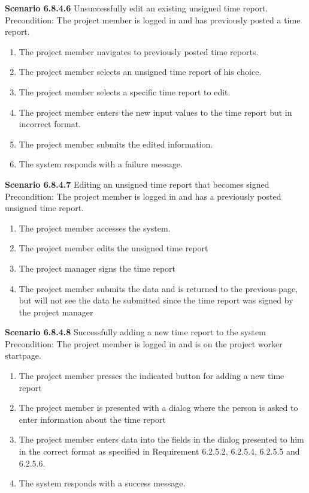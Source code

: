 \documentclass{article}
\begin{document}
\noindent\textbf{Scenario 6.8.4.6} Unsuccessfully edit an existing unsigned time report. \\
Precondition: The project member is logged in and has previously posted a time report.
\begin{enumerate}
\item The project member navigates to previously posted time reports.
\item The project member selects an unsigned time report of his choice. 
\item The project member selects a specific time report to edit.
\item The project member enters the new input values to the time report but in incorrect format.
\item The project member submits the edited information.
\item The system responds with a failure message.
\end{enumerate}

\noindent\textbf{Scenario 6.8.4.7} Editing an unsigned time report that becomes signed \\
Precondition: The project member is logged in and has a previously posted unsigned time report.
\begin{enumerate}
\item The project member accesses the system.
\item The project member edits the unsigned time report
\item The project manager signs the time report
\item The project member submits the data and is returned to the previous page, but will not see the data he submitted since the time report was signed by the project manager
\end{enumerate}

\noindent\textbf{Scenario 6.8.4.8} Successfully adding a new time report to the system \\
Precondition: The project member is logged in and is on the project worker startpage.
\begin{enumerate}
\item The project member presses the indicated button for adding a new time report
\item The project member is presented with a dialog where the person is asked to enter information about the time report
\item The project member enters data into the fields in the dialog presented to him in the correct format as specified in Requirement 6.2.5.2, 6.2.5.4, 6.2.5.5 and 6.2.5.6.
\item The system responds with a success message.
\end{enumerate}
\end{document}
